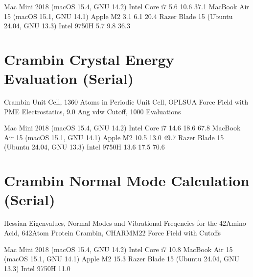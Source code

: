 \documentclass[letterpaper,11pt,english]{sphinxmanual}
\begin{document}
\sphinxAtStartPar
{}

\begin{sphinxVerbatim}[commandchars=\\\{\}]
Mac Mini 2018 (macOS 15.4, GNU 14.2)      Intel Core i7     5.6       10.6       37.1
MacBook Air 15 (macOS 15.1, GNU 14.1)        Apple M2       3.1        6.1       20.4
Razer Blade 15 (Ubuntu 24.04, GNU 13.3)    Intel 9750H      5.7        9.8       36.3
\end{sphinxVerbatim}


\section{Crambin Crystal Energy Evaluation (Serial)}
\label{\detokenize{text/benchmarks:crambin-crystal-energy-evaluation-serial}}
\sphinxAtStartPar
Crambin Unit Cell, 1360 Atoms in Periodic Unit Cell, OPLS\sphinxhyphen{}UA Force Field with PME Electrostatics, 9.0 Ang vdw Cutoff, 1000 Evaluations

\sphinxAtStartPar
{}

\begin{sphinxVerbatim}[commandchars=\\\{\}]
Mac Mini 2018 (macOS 15.4, GNU 14.2)      Intel Core i7    14.6       18.6       67.8
MacBook Air 15 (macOS 15.1, GNU 14.1)        Apple M2      10.5       13.0       49.7
Razer Blade 15 (Ubuntu 24.04, GNU 13.3)    Intel 9750H     13.6       17.5       70.6
\end{sphinxVerbatim}


\section{Crambin Normal Mode Calculation (Serial)}
\label{\detokenize{text/benchmarks:crambin-normal-mode-calculation-serial}}
\sphinxAtStartPar
Hessian Eigenvalues, Normal Modes and Vibrational Freqencies for the 42\sphinxhyphen{}Amino Acid, 642\sphinxhyphen{}Atom Protein Crambin, CHARMM\sphinxhyphen{}22 Force Field with Cutoffs

\sphinxAtStartPar
{}

\begin{sphinxVerbatim}[commandchars=\\\{\}]
Mac Mini 2018 (macOS 15.4, GNU 14.2)      Intel Core i7            10.8
MacBook Air 15 (macOS 15.1, GNU 14.1)        Apple M2              15.3
Razer Blade 15 (Ubuntu 24.04, GNU 13.3)    Intel 9750H             11.0
\end{sphinxVerbatim}
\end{document}

